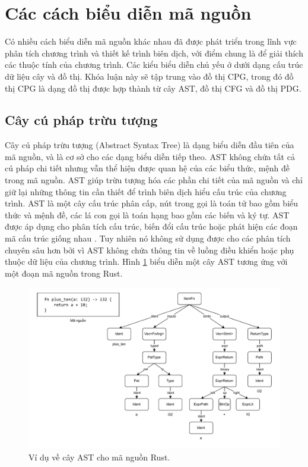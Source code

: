 \section{Các cách biểu diễn mã nguồn}

Có nhiều cách biểu diễn mã nguồn khác nhau đã được phát triển trong lĩnh vực phân tích chương trình và thiết kế trình biên dịch, với điểm chung là để giải thích các thuộc tính của chương trình. Các kiểu biểu diễn chủ yếu ở dưới dạng cấu trúc dữ liệu cây và đồ thị. Khóa luận này sẽ tập trung vào đồ thị CPG, trong đó đồ thị CPG là dạng đồ thị được hợp thành từ cây AST, đồ thị CFG và đồ thị PDG.

\subsection{Cây cú pháp trừu tượng}

Cây cú pháp trừu tượng (Abstract Syntax Tree) \cite{zhang2019novel} là dạng biểu diễn đầu tiên của mã nguồn, và là cơ sở cho các dạng biểu diễn tiếp theo.
AST không chứa tất cả cú pháp chi tiết nhưng vẫn thể hiện được quan hệ của các biểu thức, mệnh đề trong mã nguồn.
AST giúp trừu tượng hóa các phần chi tiết của mã nguồn và chỉ giữ lại những thông tin cần thiết để trình biên dịch hiểu cấu trúc của chương trình.
AST là một cây cấu trúc phân cấp, nút trong gọi là toán tử bao gồm biểu thức và mệnh đề, các lá con gọi là toán hạng bao gồm các biến và ký tự.
AST được áp dụng cho phân tích cấu trúc, biến đổi cấu trúc hoặc phát hiện các đoạn mã cấu trúc giống nhau \cite{yamaguchi2012generalized}.
Tuy nhiên nó không sử dụng được cho các phân tích chuyên sâu hơn bởi vì AST không chứa thông tin về luồng điều khiển hoặc phụ thuộc dữ liệu của chương trình.
Hình \ref{img:c2_ast} biểu diễn một cây AST tương ứng với một đoạn mã nguồn trong Rust.

\begin{figure}[H]
  \includegraphics[width=1\columnwidth]{figures/c2/c2_ast.drawio.pdf}
  \centering
  \caption{Ví dụ về cây AST cho mã nguồn Rust.}
  \label{img:c2_ast}
\end{figure}

